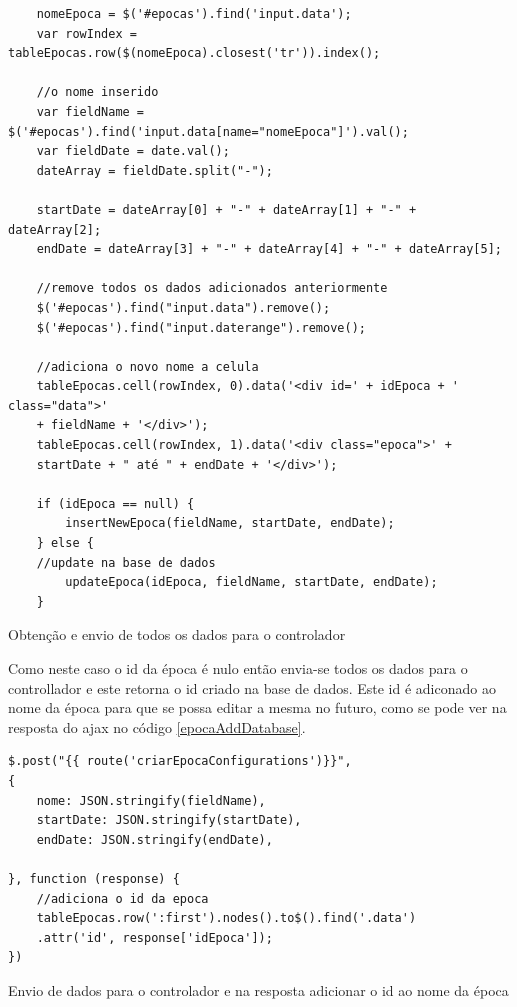 \documentclass[12pt, twoside]{report}
\begin{document}
	\begin{listing}[H]
	\begin{verbatim}
	nomeEpoca = $('#epocas').find('input.data');
	var rowIndex = tableEpocas.row($(nomeEpoca).closest('tr')).index();
		
	//o nome inserido
	var fieldName = $('#epocas').find('input.data[name="nomeEpoca"]').val();
	var fieldDate = date.val();
	dateArray = fieldDate.split("-");
			
	startDate = dateArray[0] + "-" + dateArray[1] + "-" + dateArray[2];
	endDate = dateArray[3] + "-" + dateArray[4] + "-" + dateArray[5];
	
	//remove todos os dados adicionados anteriormente
	$('#epocas').find("input.data").remove();
	$('#epocas').find("input.daterange").remove();
			
	//adiciona o novo nome a celula
	tableEpocas.cell(rowIndex, 0).data('<div id=' + idEpoca + ' class="data">' 
	+ fieldName + '</div>');
	tableEpocas.cell(rowIndex, 1).data('<div class="epoca">' + 
	startDate + " até " + endDate + '</div>');
		
	if (idEpoca == null) {
		insertNewEpoca(fieldName, startDate, endDate);
	} else {
	//update na base de dados
		updateEpoca(idEpoca, fieldName, startDate, endDate);
	}
	\end{verbatim}
	\caption{Obtenção e envio de todos os dados para o controlador}
	\label{epocasAddControlador}
	\end{listing}

	Como neste caso o id da época é nulo então envia-se todos os dados para o controllador e este retorna o id criado na base de dados. Este id é adiconado ao nome da época para que se possa editar a mesma no futuro, como se pode ver na resposta do ajax no código \ref{epocaAddDatabase}.
	
	\begin{listing}[H]
	\begin{verbatim}
$.post("{{ route('criarEpocaConfigurations')}}",
{
	nome: JSON.stringify(fieldName),
	startDate: JSON.stringify(startDate),
	endDate: JSON.stringify(endDate),
		
}, function (response) {
	//adiciona o id da epoca
	tableEpocas.row(':first').nodes().to$().find('.data')
	.attr('id', response['idEpoca']);
})
	\end{verbatim}
	\caption{Envio de dados para o controlador e na resposta adicionar o id ao nome da época}
	\label{epocaAddDatabase}
	\end{listing}
\end{document}
